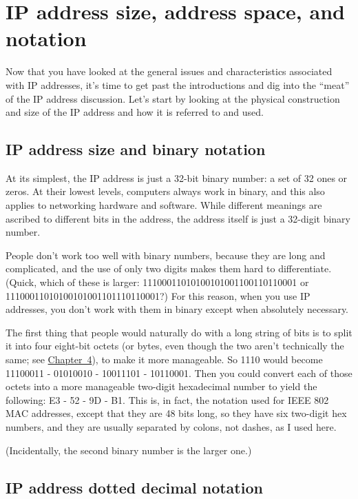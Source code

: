\section{IP address size, address space, and notation}

Now that you have looked at the general issues and characteristics
associated with IP addresses, it's time to get past the introductions
and dig into the ``meat'' of the IP address discussion.
Let's start by looking at the physical construction and size of the IP address and how it is referred to and used.


\subsection{IP address size and binary notation}

At its simplest, the IP address is just a 32-bit binary number: a set of 32 ones or zeros. At their lowest levels, computers always work in binary,
and this also applies to networking hardware and software. While
different meanings are ascribed to different bits in the address, the
address itself is just a 32-digit binary number.

People don't work too well with binary numbers, because they are long
and complicated, and the use of only two digits makes them hard to
differentiate. (Quick, which of these is larger:
11100011010100101001100110110001 or 11100011010100101001101110110001?)
For this reason, when you use IP addresses, you don't work with them in
binary except when absolutely necessary.

The first thing that people would naturally do with a long string of
bits is to split it into four eight-bit octets (or bytes, even though
the two aren't technically the same; see \protect\hyperlink{ch04.html}{Chapter~4}), to make it more manageable.
So 1110 would become 11100011 - 01010010 -
10011101 - 10110001. Then you could convert each of those octets into a
more manageable two-digit hexadecimal number to yield the following: E3
- 52 - 9D - B1. This is, in fact, the notation used for IEEE 802 MAC
addresses, except that they are 48 bits long, so they have six two-digit
hex numbers, and they are usually separated by colons, not dashes, as I
used here.

(Incidentally, the second binary number is the larger one.)



\subsection{IP address dotted decimal notation}


